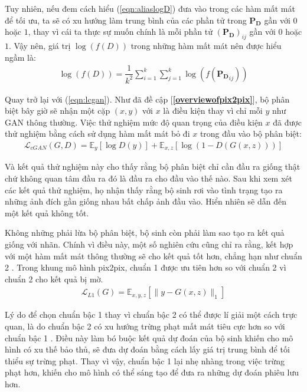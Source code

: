\documentclass[a4paper, 12pt]{report}
\begin{document}
Tuy nhiên, nếu đem cách hiểu (\ref{eqn:aliaslogD}) đưa vào trong các hàm mất mát để tối ưu, ta sẽ có xu hướng làm trung bình của các phần tử trong $\mathbf{P_D}$ gần với $0$ hoặc $1$, thay vì cái ta thực sự muốn chính là mỗi phần tử $\left(\mathbf{P_D}\right)_{ij}$ gần với $0$ hoặc $1$.
Vậy nên, giá trị $\log\left(f\left(D\right)\right)$ trong những hàm mất mát nên được hiểu ngầm là:
\begin{align}
    \log\left(f\left(D\right)\right) = \dfrac{1}{k^2}\sum_{i=1}^k\sum_{j=1}^k\log\left(f\left(\mathbf{P_D}_{ij}\right)\right)
\end{align}

Quay trở lại với (\ref{eqn:lcgan}).
Như đã đề cập [\textbf{\ref{overviewofpix2pix}}], bộ phân biệt bây giờ sẽ nhận một cặp $(x, y)$ với $x$ là điều kiện thay vì chỉ mỗi $y$ như GAN thông thường.
Việc thử nghiệm mức độ quan trọng của điều kiện $x$ đã được thử nghiệm \cite{isola2018imagetoimage} bằng cách sử dụng hàm mất mát bỏ đi $x$ trong đầu vào bộ phân biệt:
\begin{align}
    \mathcal{L}_{cGAN}\left(G, D\right) = \mathbb{E}_{y}\left[\log D\left(y\right)\right] + \mathbb{E}_{x, z}\left[\log\left(1-D\left(G\left(x, z\right)\right)\right)\right]\label{eqn:lcganwocondition}
\end{align}

Và kết quả thử nghiệm này cho thấy rằng bộ phân biệt chỉ cần đầu ra giống thật chứ không quan tâm đầu ra đó là đầu ra cho đầu vào thế nào.
Sau khi xem xét các kết quả thử nghiệm, họ nhận thấy rằng bộ sinh rơi vào tình trạng tạo ra những ảnh đích gần giống nhau bất chấp ảnh đầu vào.
Hiển nhiên sẽ dẫn đến một kết quả không tốt.\vspace{5pt}

Không những phải lừa bộ phân biệt, bộ sinh còn phải làm sao tạo ra kết quả giống với nhãn.
Chính vì điều này, một số nghiên cứu cũng chỉ ra rằng, kết hợp với một hàm mất mát thông thường sẽ cho kết quả tốt hơn, chẳng hạn như chuẩn 2 \cite{pathak2016context}.
Trong khung mô hình pix2pix, chuẩn 1 được ưu tiên hơn so với chuẩn 2 vì chuẩn 2 cho kết quả bị mờ.
\begin{align}
    \mathcal{L}_{L1}\left(G\right) = \mathbb{E}_{x, y, z}\left[\lVert y - G\left(x, z\right) \rVert_1\right]\label{eqn:l1lossforgan}
\end{align}

Lý do để chọn chuẩn bậc 1 thay vì chuẩn bậc 2 có thể được lí giải một cách trực quan, là do chuẩn bậc 2 có xu hướng trừng phạt mất mát tiêu cực hơn so với chuẩn bậc 1 \cite{replynorm1ornorm2}.
Điều này làm bó buộc kết quả dự đoán của bộ sinh khiến cho mô hình có xu thế bảo thủ, sẽ đưa dự đoán bằng cách lấy giá trị trung bình để tối thiểu sự trừng phạt.
Thay vì vậy, chuẩn bậc 1 lại nhẹ nhàng trong việc trừng phạt hơn, khiến cho mô hình có thể sáng tạo để đưa ra những dự đoán phiêu lưu hơn.\vspace{5pt}
\end{document}
